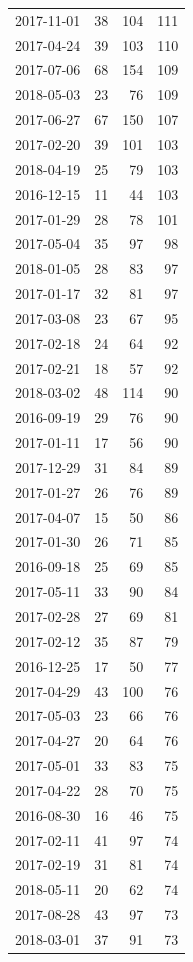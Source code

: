 \begin{tabular}{lrrr}
2017-11-01 & 38 & 104 & 111 \\
2017-04-24 & 39 & 103 & 110 \\
2017-07-06 & 68 & 154 & 109 \\
2018-05-03 & 23 & 76 & 109 \\
2017-06-27 & 67 & 150 & 107 \\
2017-02-20 & 39 & 101 & 103 \\
2018-04-19 & 25 & 79 & 103 \\
2016-12-15 & 11 & 44 & 103 \\
2017-01-29 & 28 & 78 & 101 \\
2017-05-04 & 35 & 97 & 98 \\
2018-01-05 & 28 & 83 & 97 \\
2017-01-17 & 32 & 81 & 97 \\
2017-03-08 & 23 & 67 & 95 \\
2017-02-18 & 24 & 64 & 92 \\
2017-02-21 & 18 & 57 & 92 \\
2018-03-02 & 48 & 114 & 90 \\
2016-09-19 & 29 & 76 & 90 \\
2017-01-11 & 17 & 56 & 90 \\
2017-12-29 & 31 & 84 & 89 \\
2017-01-27 & 26 & 76 & 89 \\
2017-04-07 & 15 & 50 & 86 \\
2017-01-30 & 26 & 71 & 85 \\
2016-09-18 & 25 & 69 & 85 \\
2017-05-11 & 33 & 90 & 84 \\
2017-02-28 & 27 & 69 & 81 \\
2017-02-12 & 35 & 87 & 79 \\
2016-12-25 & 17 & 50 & 77 \\
2017-04-29 & 43 & 100 & 76 \\
2017-05-03 & 23 & 66 & 76 \\
2017-04-27 & 20 & 64 & 76 \\
2017-05-01 & 33 & 83 & 75 \\
2017-04-22 & 28 & 70 & 75 \\
2016-08-30 & 16 & 46 & 75 \\
2017-02-11 & 41 & 97 & 74 \\
2017-02-19 & 31 & 81 & 74 \\
2018-05-11 & 20 & 62 & 74 \\
2017-08-28 & 43 & 97 & 73 \\
2018-03-01 & 37 & 91 & 73 \\

\end{tabular}
